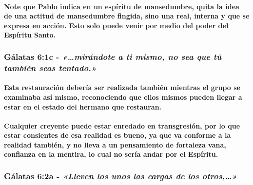 \documentclass[11a pt,twoside]{article}
\newcommand{\scripture}[1]{%
  {\fontsize{12pt}{16pt}\selectfont\ScriptureFont\itshape #1}%
}
\let\oldsubsubsection\subsubsection
\renewcommand{\subsubsection}{\needspace{4\baselineskip}\oldsubsubsection}
\let\oldparagraph\paragraph
\renewcommand{\paragraph}{\needspace{3\baselineskip}\oldparagraph}
\begin{document}
\paragraph{Note que Pablo indica en un espíritu de mansedumbre, quita la
idea de una actitud de mansedumbre fingida, sino una real, interna y que
se expresa en acción. Esto solo puede venir por medio del poder del
Espíritu
Santo.}\label{note-que-pablo-indica-en-un-espuxedritu-de-mansedumbre-quita-la-idea-de-una-actitud-de-mansedumbre-fingida-sino-una-real-interna-y-que-se-expresa-en-acciuxf3n.-esto-solo-puede-venir-por-medio-del-poder-del-espuxedritu-santo.}

\subsubsection{\texorpdfstring{Gálatas 6:1c -
\scripture{«…mirándote a ti mismo, no sea que tú también seas tentado.»}}{Gálatas 6:1c - }}\label{guxe1latas-61c---miruxe1ndote-a-ti-mismo-no-sea-que-tuxfa-tambiuxe9n-seas-tentado.}

\paragraph{Esta restauración debería ser realizada también mientras el
grupo se examinaba así mismo, reconociendo que ellos mismos pueden
llegar a estar en el estado del hermano que
restauran.}\label{esta-restauraciuxf3n-deberuxeda-ser-realizada-tambiuxe9n-mientras-el-grupo-se-examinaba-asuxed-mismo-reconociendo-que-ellos-mismos-pueden-llegar-a-estar-en-el-estado-del-hermano-que-restauran.}

\paragraph{Cualquier creyente puede estar enredado en transgresión, por
lo que estar consientes de esa realidad es bueno, ya que va conforme a
la realidad también, y no lleva a un pensamiento de fortaleza vana,
confianza en la mentira, lo cual no sería andar por el
Espíritu.}\label{cualquier-creyente-puede-estar-enredado-en-transgresiuxf3n-por-lo-que-estar-consientes-de-esa-realidad-es-bueno-ya-que-va-conforme-a-la-realidad-tambiuxe9n-y-no-lleva-a-un-pensamiento-de-fortaleza-vana-confianza-en-la-mentira-lo-cual-no-seruxeda-andar-por-el-espuxedritu.}

\subsubsection{\texorpdfstring{Gálatas 6:2a -
\scripture{«Lleven los unos las cargas de los otros,…»}}{Gálatas 6:2a - }}\label{guxe1latas-62a---lleven-los-unos-las-cargas-de-los-otros}
\end{document}
